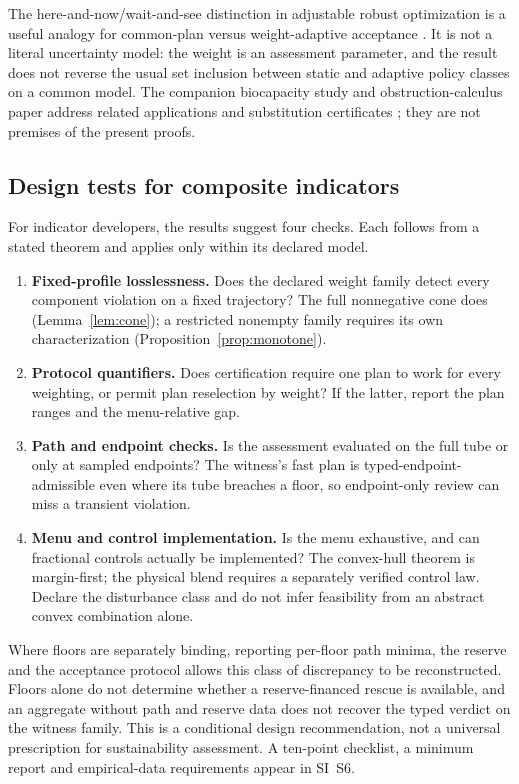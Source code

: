 \documentclass[preprint,11pt,authoryear]{elsarticle}
\theoremstyle{definition}
\theoremstyle{remark}
\begin{document}
The here-and-now/wait-and-see distinction in adjustable robust optimization is a useful analogy for common-plan versus weight-adaptive acceptance \citep{BenTal2004}. It is not a literal uncertainty model: the weight is an assessment parameter, and the result does not reverse the usual set inclusion between static and adaptive policy classes on a common model. The companion biocapacity study and obstruction-calculus paper address related applications and substitution certificates \citep{Abaee2026ecomod,Abaee2026obs}; they are not premises of the present proofs.

\subsection{Design tests for composite indicators}\label{sec:design}

For indicator developers, the results suggest four checks. Each follows from a stated theorem and applies only within its declared model.
\begin{enumerate}[leftmargin=2em]
\item \textbf{Fixed-profile losslessness.} Does the declared weight family detect every component violation on a fixed trajectory? The full nonnegative cone does (Lemma~\ref{lem:cone}); a restricted nonempty family requires its own characterization (Proposition~\ref{prop:monotone}).
\item \textbf{Protocol quantifiers.} Does certification require one plan to work for every weighting, or permit plan reselection by weight? If the latter, report the plan ranges and the menu-relative gap.
\item \textbf{Path and endpoint checks.} Is the assessment evaluated on the full tube or only at sampled endpoints? The witness's fast plan is typed-endpoint-admissible even where its tube breaches a floor, so endpoint-only review can miss a transient violation.
\item \textbf{Menu and control implementation.} Is the menu exhaustive, and can fractional controls actually be implemented? The convex-hull theorem is margin-first; the physical blend requires a separately verified control law. Declare the disturbance class and do not infer feasibility from an abstract convex combination alone.
\end{enumerate}

Where floors are separately binding, reporting per-floor path minima, the reserve and the acceptance protocol allows this class of discrepancy to be reconstructed. Floors alone do not determine whether a reserve-financed rescue is available, and an aggregate without path and reserve data does not recover the typed verdict on the witness family. This is a conditional design recommendation, not a universal prescription for sustainability assessment. A ten-point checklist, a minimum report and empirical-data requirements appear in SI~S6.
\end{document}
